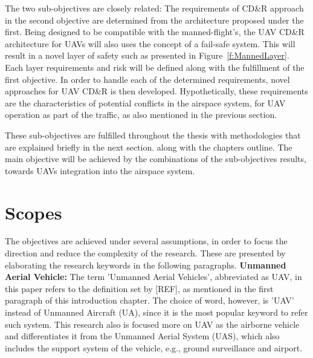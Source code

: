 The two sub-objectives are closely related: The requirements of CD\&R approach in the second objective are determined from the architecture proposed under the first. Being designed to be compatible with the manned-flight's, the UAV CD\&R architecture for UAVs will also uses the concept of a fail-safe system. This will result in a novel layer of safety such as presented in Figure~\ref{f:MannedLayer}. Each layer requirements and risk will be defined along with the fulfillment of the first objective. In order to handle each of the determined requirements, novel approaches for UAV CD\&R is then developed. Hypothetically, these requirements are the characteristics of potential conflicts in the airspace system, for UAV operation as part of the traffic, as also mentioned in the previous section. %

These sub-objectives are fulfilled throughout the thesis with methodologies that are explained briefly in the next section. along with the chapters outline. The main objective will be achieved by the combinations of the sub-objectives results, towards UAVs integration into the airspace system.

\section{Scopes}
The objectives are achieved under several assumptions, in order to focus the direction and reduce the complexity of the research. These are presented by elaborating the research keywords in the following paragraphs.
\newline
\newline
\textbf{Unmanned Aerial Vehicle:}   \qquad  The term 'Unmanned Aerial Vehicles', abbreviated as UAV, in this paper refers to the definition set by [REF], as mentioned in the first paragraph of this introduction chapter. The choice of word, however, is 'UAV' instead of Unmanned Aircraft (UA), since it is the most popular keyword to refer such system. This research also is focused more on UAV as the airborne vehicle and differentiates it from the Unmanned Aerial System (UAS)\cite{Dalamagkidis:09}, which also includes the support system of the vehicle, e.g., ground surveillance and airport. 

